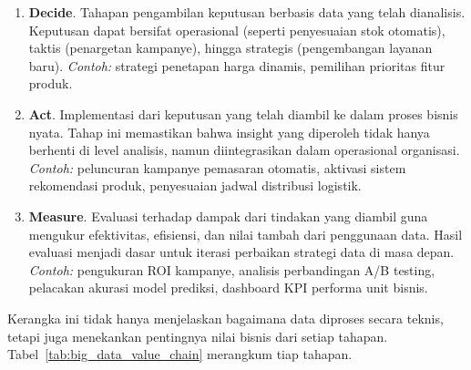 \begin{enumerate}
	\item \textbf{Decide}. Tahapan pengambilan keputusan berbasis data yang telah dianalisis. Keputusan dapat bersifat operasional (seperti penyesuaian stok otomatis), taktis (penargetan kampanye), hingga strategis (pengembangan layanan baru). \textit{Contoh:} strategi penetapan harga dinamis, pemilihan prioritas fitur produk.
	
	\item \textbf{Act}. Implementasi dari keputusan yang telah diambil ke dalam proses bisnis nyata. Tahap ini memastikan bahwa insight yang diperoleh tidak hanya berhenti di level analisis, namun diintegrasikan dalam operasional organisasi. \textit{Contoh:} peluncuran kampanye pemasaran otomatis, aktivasi sistem rekomendasi produk, penyesuaian jadwal distribusi logistik.
	
	\item \textbf{Measure}. Evaluasi terhadap dampak dari tindakan yang diambil guna mengukur efektivitas, efisiensi, dan nilai tambah dari penggunaan data. Hasil evaluasi menjadi dasar untuk iterasi perbaikan strategi data di masa depan. \textit{Contoh:} pengukuran ROI kampanye, analisis perbandingan A/B testing, pelacakan akurasi model prediksi, dashboard KPI performa unit bisnis.
\end{enumerate}


Kerangka ini tidak hanya menjelaskan bagaimana data diproses secara teknis, tetapi juga menekankan pentingnya nilai bisnis dari setiap tahapan. Tabel~\ref{tab:big_data_value_chain} merangkum tiap tahapan.

